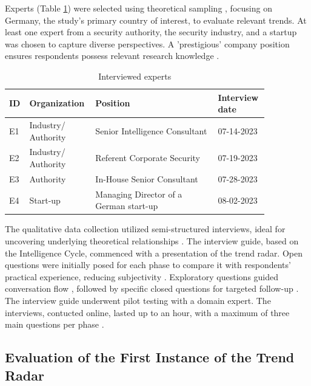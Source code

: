 \documentclass[10pt]{article}
\begin{document}
Experts (Table \ref{tab:experts}) were selected using theoretical sampling \cite{Glaser.1967}, focusing on Germany, the study's primary country of interest, to evaluate relevant trends. At least one expert from a security authority, the security industry, and a startup was chosen to capture diverse perspectives. A 'prestigious' company position ensures respondents possess relevant research knowledge \cite{Bogner.2002b}.

\begin{table}[hbtp]
    \caption{Interviewed experts}
    \begin{tabular}{p{0.05\linewidth}p{0.2\linewidth}p{0.45\linewidth}p{0.15\linewidth}}
        \toprule
        \textbf{ID} & \textbf{Organization} & \textbf{Position}                      & \textbf{Interview date} \\
        \hline
        E1          & Industry/ Authority   & Senior Intelligence Consultant         & 07-14-2023              \\
        \hline
        E2          & Industry/ Authority   & Referent Corporate Security            & 07-19-2023              \\
        \hline
        E3          & Authority             & In-House Senior Consultant             & 07-28-2023              \\
        \hline
        E4          & Start-up              & Managing Director of a German start-up & 08-02-2023              \\
        \bottomrule
    \end{tabular}
    \label{tab:experts}
\end{table}
The qualitative data collection utilized semi-structured interviews, ideal for uncovering underlying theoretical relationships \cite{Bogner.2014}. The interview guide, based on the Intelligence Cycle, commenced with a presentation of the trend radar. Open questions were initially posed for each phase to compare it with respondents' practical experience, reducing subjectivity \cite{Saunders.2012}. Exploratory questions guided conversation flow \cite{Saunders.2012}, followed by specific closed questions for targeted follow-up \cite{Saunders.2012}. The interview guide underwent pilot testing with a domain expert. The interviews, contucted online, lasted up to an hour, with a maximum of three main questions per phase \cite{Bogner.2014}.

\subsection{Evaluation of the First Instance of the Trend Radar}
\end{document}
